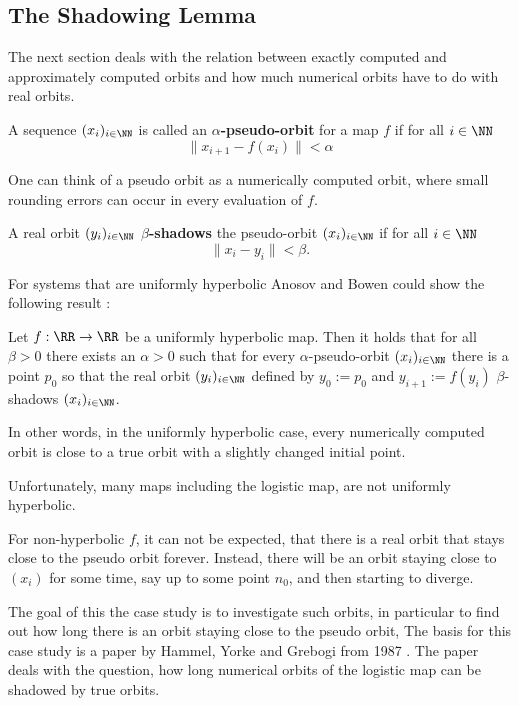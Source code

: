   \subsection{The Shadowing Lemma}
    The next section deals with the relation between exactly computed and approximately computed orbits and how much numerical orbits have to do with real orbits. 
    \begin{definition}\label{def:pseudoorbit}
      A sequence $(x_i)_{i \in \NN}$ is called an \textbf{$\alpha$-pseudo-orbit} for a map $f$ if for all $i \in \NN$
      $$ \| x_{i+1} - f(x_i) \| < \alpha $$  
    \end{definition}
    One can think of a pseudo orbit as a numerically computed orbit, where small rounding errors can occur in every evaluation of $f$.
    \begin{definition}\label{def:shadowing}
      A real orbit $(y_i)_{i \in \NN}$ \textbf{$\beta$-shadows} the pseudo-orbit $(x_i)_{i \in \NN}$ if for all $i \in \NN$
      $$\| x_i - y_i \| < \beta.$$  
    \end{definition}
    For systems that are uniformly hyperbolic Anosov and Bowen could show the following result \cite{anosov1967} \cite{Bowen1975} \cite{Hasselblatt:2008}:
    \begin{theorem}
     Let $f: \RR \to \RR$ be a uniformly hyperbolic map.
     Then it holds that for all $\beta > 0$ there exists an $\alpha > 0$ such that for every $\alpha$-pseudo-orbit $(x_i)_{i \in \NN}$
     there is a point $p_0$ so that the real orbit $(y_i)_{i \in \NN}$ defined by $y_0 := p_0$ and $y_{i+1} := f(y_i)$ $\beta$-shadows $(x_i)_{i \in \NN}$.
    \end{theorem} 
    In other words, in the uniformly hyperbolic case, every numerically computed orbit is close to a true orbit with a slightly changed initial point.

    Unfortunately, many maps including the logistic map, are not uniformly hyperbolic. 

    For non-hyperbolic $f$, it can not be expected, that there is a real orbit that stays close to the pseudo orbit forever.
    Instead, there will be an orbit staying close to $(x_i)$ for some time, say up to some point $n_0$, and then starting to diverge. 

    The goal of this the case study is to investigate such orbits, in particular to find out how long there is an orbit staying close to the pseudo orbit,
    The basis for this case study is a paper by Hammel, Yorke and Grebogi from 1987 \cite{Hammel1987}.
    The paper deals with the question, how long numerical orbits of the logistic map can be shadowed by true orbits.

